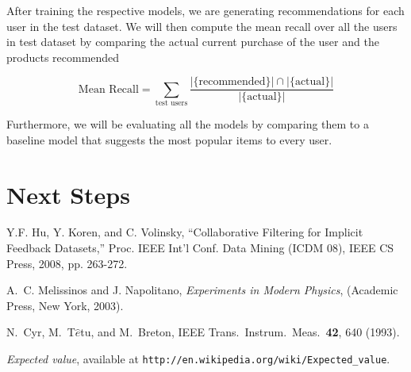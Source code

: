 \documentclass[letterpaper,12pt]{article}
\begin{document}
After training the respective models, we are generating recommendations for each user in the test dataset. We will then compute the mean recall over all the users in test dataset by comparing the actual current purchase of the user and the products recommended

\begin{equation*}
	\text{Mean Recall} = \sum_{\text{test users}} \frac{|\{\text{recommended}\}| \cap |\{\text{actual}\}|}{|\{\text{actual}\}|}
\end{equation*}


Furthermore, we will be evaluating all the models by comparing them to a baseline model that suggests the most popular items to every user.

\section{Next Steps}






\begin{thebibliography}{99}

Y.F. Hu, Y. Koren, and C. Volinsky, “Collaborative Filtering for Implicit Feedback Datasets,” Proc. IEEE Int’l Conf. Data Mining (ICDM 08), IEEE CS Press, 2008, pp. 263-272.


A.~C. Melissinos and J. Napolitano, \textit{Experiments in Modern Physics},
(Academic Press, New York, 2003).

N.\ Cyr, M.\ T$\hat{e}$tu, and M.\ Breton,
IEEE Trans.\ Instrum.\ Meas.\ \textbf{42}, 640 (1993).

 \emph{Expected value},  available at
\texttt{http://en.wikipedia.org/wiki/Expected\_value}.

\end{thebibliography}
\end{document}
